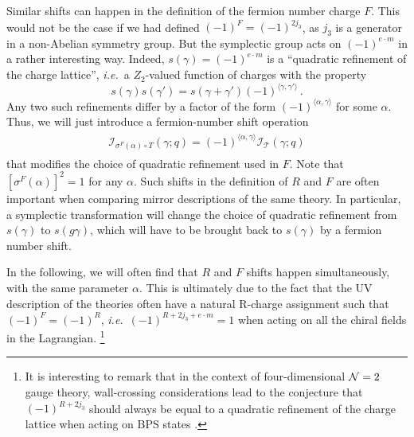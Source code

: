 \documentclass[11pt,letterpaper]{article}
\numberwithin{equation}{section}
\newcommand{\be}{\begin{equation}}
\newcommand{\ee}{\end{equation}}
\newcommand{\ie}{\emph{i.e.}}
\newcommand{\CI}{\mathcal{I}}
\newcommand{\CT}{\mathcal{T}}
\newcommand{\q}{q}
\begin{document}
Similar shifts can happen in the definition of the fermion number charge $F$.  This would not be the case if we had defined $(-1)^F = (-1)^{2 j_3}$,
as $j_3$ is a generator in a non-Abelian symmetry group. But the symplectic group acts on $(-1)^{e\cdot m}$ in a rather interesting way. Indeed, $s(\gamma) = (-1)^{e \cdot m}$ is a ``quadratic refinement of the charge lattice'',
\ie\ a $Z_2$-valued function of charges with the property
\begin{equation}
s(\gamma) s(\gamma') = s(\gamma + \gamma') (-1)^{\langle \gamma, \gamma' \rangle}\,.
\end{equation}
Any two such refinements differ by a factor of the form  $(-1)^{\langle \alpha, \gamma \rangle}$ for some $\alpha$.
%
Thus, we will just introduce a fermion-number shift operation
%
\be
\boxed{\phantom{\int} \CI_{\sigma^F(\alpha) \circ T}(\gamma;\q) = (-1)^{\langle \alpha, \gamma \rangle} \CI_\CT(\gamma;\q) \phantom{\int}}
\ee
%
that modifies the choice of quadratic refinement used in $F$. Note that $[\sigma^F(\alpha)]^2=1$ for any $\alpha$.
Such shifts in the definition of $R$ and $F$ are often important when comparing mirror descriptions of the same theory.
In particular, a symplectic transformation will change the choice of quadratic refinement from $s(\gamma)$ to $s(g \gamma)$,
which will have to be brought back to $s(\gamma)$ by a fermion number shift.


In the following, we will often find that $R$ and $F$ shifts happen simultaneously, with the same parameter $\alpha$.
This is ultimately due to the fact that the UV description of the theories often have a natural R-charge assignment
such that $(-1)^F = (-1)^R$, \ie\ $(-1)^{R + 2 j_3 + e \cdot m} =1$ when acting on all the chiral fields in the Lagrangian.%
%
\footnote{It is interesting to remark that in the context of four-dimensional ${\cal N}=2$ gauge theory, wall-crossing considerations lead
to the conjecture that $(-1)^{R + 2 j_3}$ should always be equal to a quadratic refinement of the charge lattice when acting on BPS states \cite{GMNIII}.}
\end{document}
